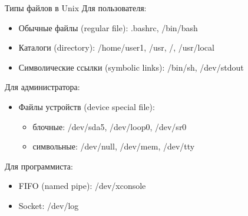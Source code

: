 %
%
%
%
%
%

\begin{frame}{Типы файлов в Unix}
  Для пользователя:
  \begin{itemize}
    \item \alert{Обычные файлы (regular file)}: .bashrc, /bin/bash
    \item \alert{Каталоги (directory)}: /home/user1, /usr, /, /usr/local  \pause
    \item \alert{Символические ссылки (symbolic links)}: /bin/sh, /dev/stdout
  \end{itemize} \pause
  Для администратора:
  \begin{itemize}
    \item \alert{Файлы устройств (device special file)}:
      \begin{itemize}
        \item \alert{блочные}: /dev/sda5, /dev/loop0, /dev/sr0
        \item \alert{символьные}: /dev/null, /dev/mem, /dev/tty
      \end{itemize}
  \end{itemize} \pause
  Для программиста:
  \begin{itemize}
    \item \alert{FIFO (named pipe)}: /dev/xconsole
    \item \alert{Socket}: /dev/log
  \end{itemize}

\end{frame}

%

